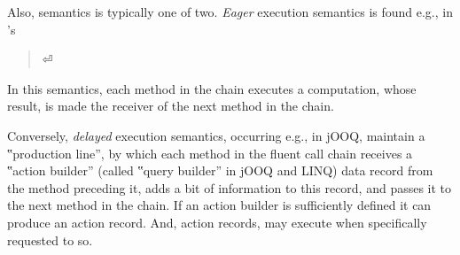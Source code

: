   
  
  
  Also, semantics is typically one of two.
\emph{Eager} execution semantics is
found e.g., in \Java's 

\begin{quote}
  \parbox[c]{50ex}{}⏎
\end{quote}

In this semantics, each method in the chain executes a computation,
  whose result, is made the receiver of the next method
  in the chain.

Conversely, \emph{delayed} execution semantics, occurring e.g., in jOOQ,
  maintain a ‟production line”,
  by which each method in the fluent call chain receives a
  ‟action builder” (called ‟query builder” in jOOQ and LINQ)
  data record from the method preceding it, adds a bit of
  information to this record, and passes it to the next method
  in the chain.
If an action builder is sufficiently defined it can
  produce an action record.
And, action records, may execute
  when specifically requested to so.


